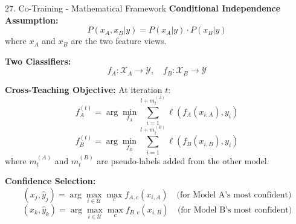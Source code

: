\documentclass[8pt]{beamer}
\begin{document}
	\begin{frame}{27. Co-Training - Mathematical Framework}
		\fontsize{6.5}{7.5}\selectfont
		\textbf{Conditional Independence Assumption:}
		\[
		P(x_A, x_B | y) = P(x_A | y) \cdot P(x_B | y)
		\]
		where $x_A$ and $x_B$ are the two feature views.
		
		\textbf{Two Classifiers:}
		\[
		f_A: \mathcal{X}_A \rightarrow \mathcal{Y}, \quad f_B: \mathcal{X}_B \rightarrow \mathcal{Y}
		\]
		
		\textbf{Cross-Teaching Objective:}
		At iteration $t$:
		\[
		f_A^{(t)} = \arg\min_{f_A} \sum_{i=1}^{l + m_t^{(A)}} \ell(f_A(x_{i,A}), y_i)
		\]
		\[
		f_B^{(t)} = \arg\min_{f_B} \sum_{i=1}^{l + m_t^{(B)}} \ell(f_B(x_{i,B}), y_i)
		\]
		where $m_t^{(A)}$ and $m_t^{(B)}$ are pseudo-labels added from the other model.
		
		\textbf{Confidence Selection:}
		\[
		(x_j, \hat{y}_j) = \arg\max_{i \in \mathcal{U}} \max_c f_{A,c}(x_{i,A}) \quad \text{(for Model A's most confident)}
		\]
		\[
		(x_k, \hat{y}_k) = \arg\max_{i \in \mathcal{U}} \max_c f_{B,c}(x_{i,B}) \quad \text{(for Model B's most confident)}
		\]
	\end{frame}
	
\end{document}
